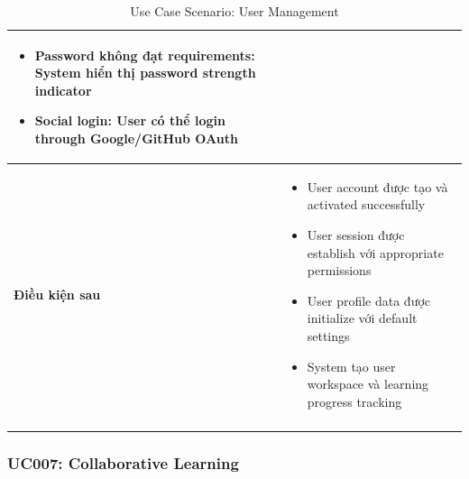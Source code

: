 \begin{longtable}{|p{4cm}|p{10cm}|}
\begin{itemize}
    \item Password không đạt requirements: System hiển thị password strength indicator
    \item Social login: User có thể login through Google/GitHub OAuth
\end{itemize} \\ \hline
\textbf{Điều kiện sau} & 
\begin{itemize}
    \item User account được tạo và activated successfully
    \item User session được establish với appropriate permissions
    \item User profile data được initialize với default settings
    \item System tạo user workspace và learning progress tracking
\end{itemize} \\ \hline
\caption{Use Case Scenario: User Management}
\label{tab:uc006} \\
\end{longtable}

\subsubsection{UC007: Collaborative Learning}

